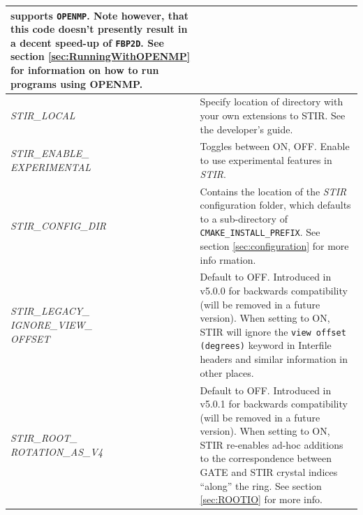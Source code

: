 \documentclass{article}
\begin{document}
\begin{longtable}{|p{\MakeTableFirstCol}|p{\MakeTableSecondCol}|}
{{supports \texttt{OPENMP}. Note however, that this code doesn't presently result 
in a decent speed-up of \texttt{FBP2D}.}
See section \ref{sec:RunningWithOPENMP} for information on how to run programs using OPENMP.
} \\
\hline
{\raggedright \textit{STIR\_LOCAL}} & 
{\raggedright Specify location of directory with your own extensions to STIR. See
the developer's guide.}\\
\hline
{\raggedright \textit{STIR\_ENABLE\_\\EXPERIMENTAL}} & 
{\raggedright Toggles between ON, OFF. Enable to use experimental features in \textit{STIR}.}\\
\hline
{\raggedright \textit{STIR\_CONFIG\_DIR}} & 
{\raggedright Contains the location of the \textit{STIR} configuration folder, which defaults to a sub-directory of \texttt{CMAKE\_INSTALL\_PREFIX}. See section \ref{sec:configuration} for more info
rmation.}\\
\hline
{\raggedright \textit{STIR\_LEGACY\_\\IGNORE\_VIEW\_\\OFFSET}} & 
{\raggedright Default to OFF. Introduced in v5.0.0 for backwards compatibility (will be removed in a future version).
When setting to ON, STIR will ignore the \texttt{view offset (degrees)} keyword in Interfile headers and similar information in other places.}\\
\hline
{\raggedright \textit{STIR\_ROOT\_\\ROTATION\_AS\_V4}} & 
{\raggedright Default to OFF. Introduced in v5.0.1 for backwards compatibility (will be removed in a future version).
When setting to ON, STIR re-enables ad-hoc additions to the correspondence between GATE and STIR crystal indices ``along'' the ring.
See section \ref{sec:ROOTIO} for more info.}\\
\hline
\end{longtable}
\end{document}
